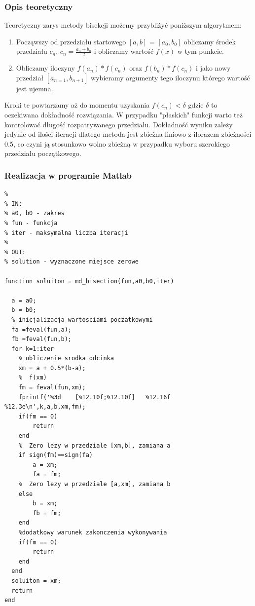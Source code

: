 \documentclass[11pt, oneside]{article}   	%
\begin{document}
\subsubsection{Opis teoretyczny}
Teoretyczny zarys metody bisekcji możemy przybliżyć poniższym algorytmem:
\begin{enumerate}
  \item Począwszy od przedziału startowego $[a,b]$ = $[a_{0},b_{0}]$ obliczamy środek przedziału $c_{n}$,
  	$c_{n} = \frac{a_{n}+b_{n}}{2}$
  i obliczamy wartość $f(x)$ w tym punkcie. 
  \item Obliczamy iloczyny $f(a_{n})*f(c_{n})$ oraz $f(b_{n})*f(c_{n})$ i jako nowy przedział $[a_{n=1},b_{n+1}]$
  wybieramy argumenty tego iloczynu którego wartość jest ujemna. 
\end{enumerate} 
Kroki te powtarzamy aż do momentu uzyskania $f(c_{n})<\delta$ gdzie $\delta$ to oczekiwana dokładność rozwiązania. W przypadku "płaskich"  funkcji warto też kontrolować długość rozpatrywanego przedziału. 
Dokładność wyniku zależy jedynie od ilości iteracji dlatego metoda jest zbieżna liniowo z ilorazem zbieżności 0.5, co czyni ją stosunkowo wolno zbieżną w przypadku wyboru szerokiego przedziału początkowego. 


\subsubsection{Realizacja w programie Matlab}
\begin{lstlisting}[caption=Implementacja metody bisekcji]
% Funkcja wyznaczajaca punkty zerowe funkcji metoda bisekcji
%
% IN:
% a0, b0 - zakres
% fun - funkcja 
% iter - maksymalna liczba iteracji
%
% OUT:
% solution - wyznaczone miejsce zerowe

function soluiton = md_bisection(fun,a0,b0,iter)

  a = a0; 
  b = b0;
  % inicjalizacja wartosciami poczatkowymi
  fa =feval(fun,a);     
  fb =feval(fun,b);
  for k=1:iter
    % obliczenie srodka odcinka
    xm = a + 0.5*(b-a);    
    %  f(xm) 
    fm = feval(fun,xm);      
    fprintf('%3d    [%12.10f;%12.10f]	%12.16f     %12.3e\n',k,a,b,xm,fm);
    if(fm == 0)
        return
    end
    %  Zero lezy w przedziale [xm,b], zamiana a
    if sign(fm)==sign(fa)    
        a = xm;
        fa = fm;
    %  Zero lezy w przedziale [a,xm], zamiana b
    else                     
        b = xm;
        fb = fm;
    end
    %dodatkowy warunek zakonczenia wykonywania
    if(fm == 0) 
        return
    end
  end
  soluiton = xm; 
  return
end
	

		
\end{lstlisting}
\end{document}
